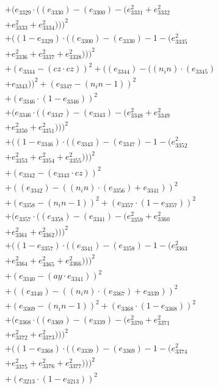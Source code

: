 \documentclass[10pt, a4paper]{article}
\begin{document}
\begin{align*}
& + (e_{3329}  \cdot  ((e_{3330}) - (e_{3300}) - (e_{3331}^{2} + e_{3332}^{2} \\
& + e_{3333}^{2} + e_{3334}^{2})))^{2} \\
& + ((1 - e_{3329})  \cdot  ((e_{3300}) - (e_{3330}) - 1 - (e_{3335}^{2} \\
& + e_{3336}^{2} + e_{3337}^{2} + e_{3338}^{2})))^{2} \\
& + (e_{3344} - (cz  \cdot  cz))^{2} + ((e_{3344}) - ((n_in)  \cdot  (e_{3345}) \\
& + e_{3343}))^{2} + (e_{3347} - (n_in - 1))^{2} \\
& + (e_{3346}  \cdot  (1 - e_{3346}))^{2} \\
& + (e_{3346}  \cdot  ((e_{3347}) - (e_{3343}) - (e_{3348}^{2} + e_{3349}^{2} \\
& + e_{3350}^{2} + e_{3351}^{2})))^{2} \\
& + ((1 - e_{3346})  \cdot  ((e_{3343}) - (e_{3347}) - 1 - (e_{3352}^{2} \\
& + e_{3353}^{2} + e_{3354}^{2} + e_{3355}^{2})))^{2} \\
& + (e_{3342} - (e_{3343}  \cdot  cz))^{2} \\
& + ((e_{3342}) - ((n_in)  \cdot  (e_{3356}) + e_{3341}))^{2} \\
& + (e_{3358} - (n_in - 1))^{2} + (e_{3357}  \cdot  (1 - e_{3357}))^{2} \\
& + (e_{3357}  \cdot  ((e_{3358}) - (e_{3341}) - (e_{3359}^{2} + e_{3360}^{2} \\
& + e_{3361}^{2} + e_{3362}^{2})))^{2} \\
& + ((1 - e_{3357})  \cdot  ((e_{3341}) - (e_{3358}) - 1 - (e_{3363}^{2} \\
& + e_{3364}^{2} + e_{3365}^{2} + e_{3366}^{2})))^{2} \\
& + (e_{3340} - (ay  \cdot  e_{3341}))^{2} \\
& + ((e_{3340}) - ((n_in)  \cdot  (e_{3367}) + e_{3339}))^{2} \\
& + (e_{3369} - (n_in - 1))^{2} + (e_{3368}  \cdot  (1 - e_{3368}))^{2} \\
& + (e_{3368}  \cdot  ((e_{3369}) - (e_{3339}) - (e_{3370}^{2} + e_{3371}^{2} \\
& + e_{3372}^{2} + e_{3373}^{2})))^{2} \\
& + ((1 - e_{3368})  \cdot  ((e_{3339}) - (e_{3369}) - 1 - (e_{3374}^{2} \\
& + e_{3375}^{2} + e_{3376}^{2} + e_{3377}^{2})))^{2} \\
& + (e_{3213}  \cdot  (1 - e_{3213}))^{2} \\

\end{align*}
\end{document}
